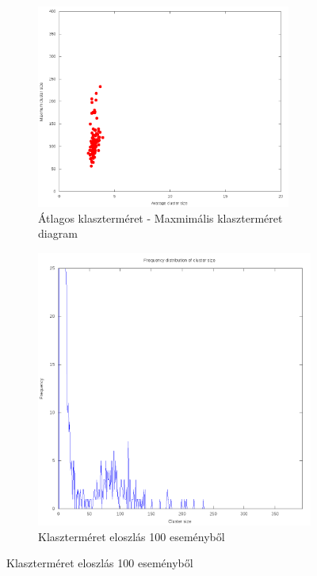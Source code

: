 \documentclass[a4paper,12pt]{article}
\begin{document}
\begin{figure}[H]
	\centering
	\begin{subfigure}{.49\textwidth}
		\includegraphics[width=0.92\textwidth]{mean-max13_100.png}
		\caption{ Átlagos klaszterméret - Maxmimális klaszterméret diagram }
	\end{subfigure}
	\begin{subfigure}{.49\textwidth}
		\includegraphics[width=.92\textwidth]{distribution_zoomed_13_100.png}
		\caption{ Klaszterméret eloszlás 100 eseményből } 
	\end{subfigure}
\end{figure}
\end{document}
